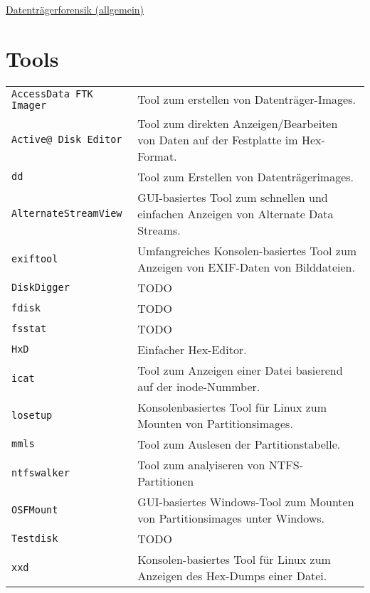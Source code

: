 \raggedright
\footnotesize
\begin{multicols}{3}	
	\setlength{\premulticols}{1pt}
	\setlength{\postmulticols}{1pt}
	\setlength{\multicolsep}{1pt}
	\setlength{\columnsep}{2pt}

\begin{center}
     \Large{\underline{Datenträgerforensik (allgemein)}} \\
\end{center}

\section{Tools}
\begin{tabular}{@{}p{\the\MyLen}
		@{}p{\linewidth-\the\MyLen}@{}}
	\texttt{AccessData FTK Imager} & Tool zum erstellen von Datenträger-Images.\\
	\texttt{Active@ Disk Editor} & Tool zum direkten Anzeigen/Bearbeiten von Daten auf der Festplatte im Hex-Format.\\
	\texttt{dd} & Tool zum Erstellen von Datenträgerimages.\\
	\texttt{Alternate\-Stream\-View} & GUI-basiertes Tool zum schnellen und einfachen Anzeigen von Alternate Data Streams.\\
	\texttt{exiftool} & Umfangreiches Konsolen-basiertes Tool zum Anzeigen von EXIF-Daten von Bilddateien.\\
	\texttt{DiskDigger} & TODO\\
	\texttt{fdisk} & TODO\\
	\texttt{fsstat} & TODO\\
	\texttt{HxD} & Einfacher Hex-Editor.\\
	\texttt{icat} & Tool zum Anzeigen einer Datei basierend auf der inode-Nummber.\\
	\texttt{losetup} & Konsolenbasiertes Tool für Linux zum Mounten von Partitionsimages.\\
	\texttt{mmls} & Tool zum Auslesen der Partitionstabelle.\\
	\texttt{ntfswalker} & Tool zum analyiseren von NTFS-Partitionen\\
	\texttt{OSFMount} & GUI-basiertes Windows-Tool zum Mounten von Partitionsimages unter Windows.\\
	\texttt{Testdisk} & TODO\\
	\texttt{xxd} & Konsolen-basiertes Tool für Linux zum Anzeigen des Hex-Dumps einer Datei.\\
\end{tabular}
\lipsum
\end{multicols}